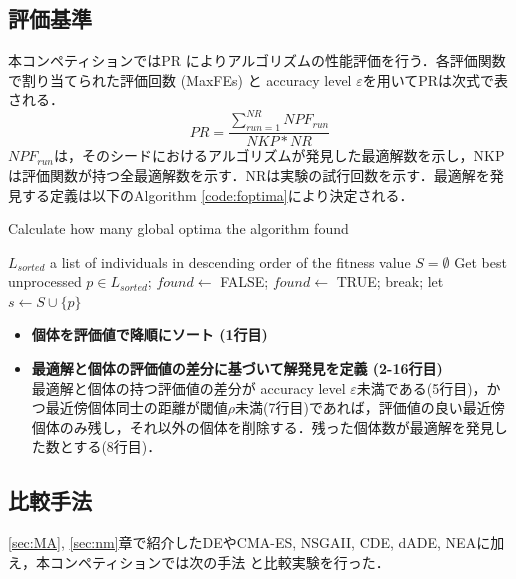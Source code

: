 \documentclass[a4j,11pt]{jarticle}
\begin{document}
\FloatBarrier

\subsection{評価基準}
\label{ss:eval_criteria}
本コンペティションではPR \cite{CEC2013} によりアルゴリズムの性能評価を行う．各評価関数で割り当てられた評価回数 (MaxFEs) と accuracy level $\varepsilon$を用いてPRは次式で表される．
\begin{equation}
\label{eq:PR}
PR=\frac{\sum_{run=1}^{NR}NPF_{run}}{NKP*NR}
\end{equation}
$NPF_{run}$は，そのシードにおけるアルゴリズムが発見した最適解数を示し，NKPは評価関数が持つ全最適解数を示す．NRは実験の試行回数を示す．最適解を発見する定義は以下のAlgorithm \ref{code:foptima}により決定される．

\begin{algorithm}[H]
\caption{Calculate how many global optima the algorithm found}
\label{code:foptima}
\begin{algorithmic}[2]
\REQUIRE $L_{sorted}$ a list of individuals in descending order of the fitness value
\STATE $S = \emptyset$
\STATE Get best unprocessed $p \in L_{sorted}$;
\STATE $found \leftarrow$ FALSE;
\STATE $found \leftarrow$ TRUE;
\STATE break;
\ENDIF
\ENDFOR
{}
\STATE let $s \leftarrow S \cup \{p\}$
\ENDIF
\ENDIF
\ENDWHILE
\end{algorithmic}
\end{algorithm}

\begin{itemize}
	\item {\bf 個体を評価値で降順にソート (1行目)}\\
	\item {\bf 最適解と個体の評価値の差分に基づいて解発見を定義 (2-16行目)}\\
	最適解と個体の持つ評価値の差分が accuracy level $\varepsilon$未満である(5行目)，かつ最近傍個体同士の距離が閾値$\rho$未満(7行目)であれば，評価値の良い最近傍個体のみ残し，それ以外の個体を削除する．残った個体数が最適解を発見した数とする(8行目)．
\end{itemize}
\FloatBarrier

\subsection{比較手法}
\ref{sec:MA}, \ref{sec:nm}章で紹介したDEやCMA-ES, NSGAII, CDE, dADE, NEAに加え，本コンペティションでは次の手法 \cite{PNA-NSGA} \cite{DEs} \cite{N-VMO} と比較実験を行った．
\end{document}
